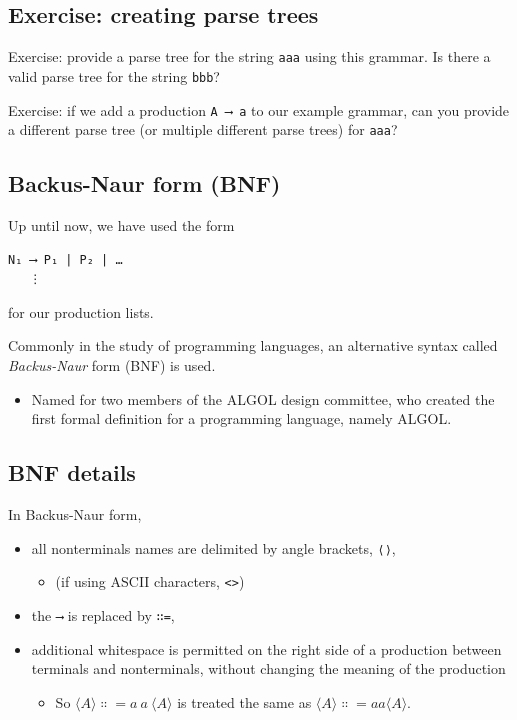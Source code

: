 \documentclass[11pt]{article}
\theoremstyle{definition}
\begin{document}
\subsection{Exercise: creating parse trees}
\label{sec:org3c97218}
Exercise: provide a parse tree for the string \texttt{aaa} using this grammar.
Is there a valid parse tree for the string \texttt{bbb}?

Exercise: if we add a production \texttt{A ⟶ a} to our example grammar,
can you provide a different parse tree
(or multiple different parse trees) for \texttt{aaa}?

\subsection{Backus-Naur form (BNF)}
\label{sec:orge898696}
Up until now, we have used the form
\begin{verbatim}
N₁ ⟶ P₁ | P₂ | …
   ⋮
\end{verbatim}
for our production lists.

Commonly in the study of programming languages,
an alternative syntax called \emph{Backus-Naur} form (BNF)
is used.
\begin{itemize}
\item Named for two members of the ALGOL design committee,
who created the first formal definition for a programming language,
namely ALGOL.
\end{itemize}

\subsection{BNF details}
\label{sec:org73d6b60}
In Backus-Naur form,
\begin{itemize}
\item all nonterminals names are delimited by
angle brackets, \texttt{⟨⟩},
\begin{itemize}
\item (if using ASCII characters, \texttt{<>})
\end{itemize}
\item the \texttt{⟶} is replaced by \texttt{∷=},
\item additional whitespace is permitted on the right side
of a production between terminals and nonterminals,
without changing the meaning of the production
\begin{itemize}
\item So \(⟨A⟩ ∷= a\ a\ ⟨A⟩\) is treated the same as \(⟨A⟩ ∷= aa⟨A⟩\).
\end{itemize}
\end{itemize}
\end{document}

